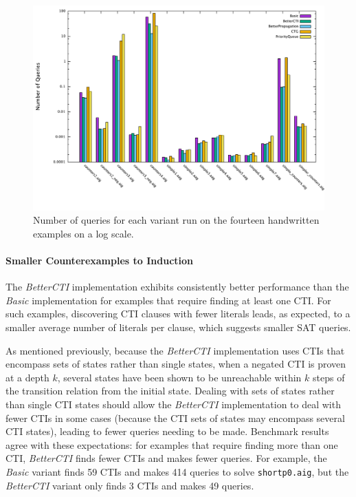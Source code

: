 \documentclass[12pt,a4paper,twoside,openright]{report}
\begin{document}
{\begin{figure}[!ht]
\includegraphics[width=16cm]{numqueries.pdf}
\caption{Number of queries for each variant run on the fourteen handwritten examples on a log scale.}
\end{figure}

\paragraph{Smaller Counterexamples to Induction}{
The \emph{BetterCTI} implementation exhibits consistently
better performance than the \emph{Basic} implementation for examples
that require finding at least one CTI. For such examples,
discovering CTI clauses with fewer literals leads, as expected, to a smaller average number of
literals per clause, which suggests smaller SAT queries.

As mentioned previously, because the \emph{BetterCTI} implementation uses
CTIs that encompass sets of states rather than single states, when a negated CTI is proven at a depth
$k$, several states have been shown to be unreachable within $k$ steps of the transition relation
from the initial state. Dealing with sets of states rather than single CTI states should allow
the \emph{BetterCTI} implementation to deal with fewer CTIs in some cases (because the CTI sets of states
may encompass several CTI states), leading to fewer queries needing to be made. Benchmark results
agree with these expectations: for examples that require finding more than one CTI, \emph{BetterCTI}
finds fewer CTIs and makes fewer queries. For example, the \emph{Basic} variant finds 59
CTIs and makes 414 queries to solve \verb,shortp0.aig,, but the \emph{BetterCTI} variant only
finds 3 CTIs and makes 49 queries.

}}
\end{document}
